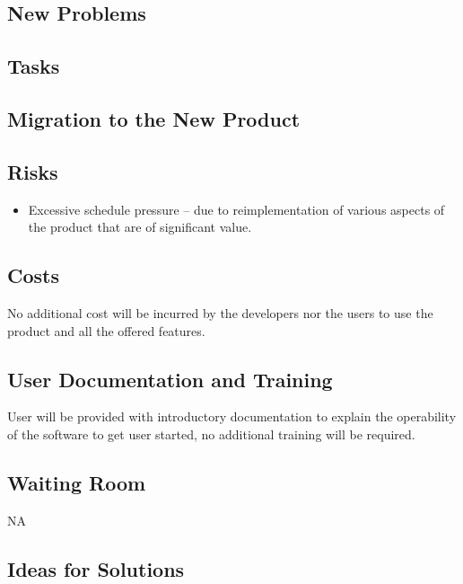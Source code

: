 \documentclass[12pt, titlepage]{article}
\begin{document}
\subsection{New Problems}

\subsection{Tasks}

\subsection{Migration to the New Product}

\subsection{Risks}

\begin{itemize}
\item Excessive schedule pressure – due to reimplementation of various aspects of the product that are of significant value.
\end{itemize}

\subsection{Costs}

No additional cost will be incurred by the developers nor the users to use the product and all the offered features. 

\subsection{User Documentation and Training}

User will be provided with introductory documentation to explain the operability of the software to get user started, no additional training will be required. 

\subsection{Waiting Room}

NA

\subsection{Ideas for Solutions}


\end{document}
